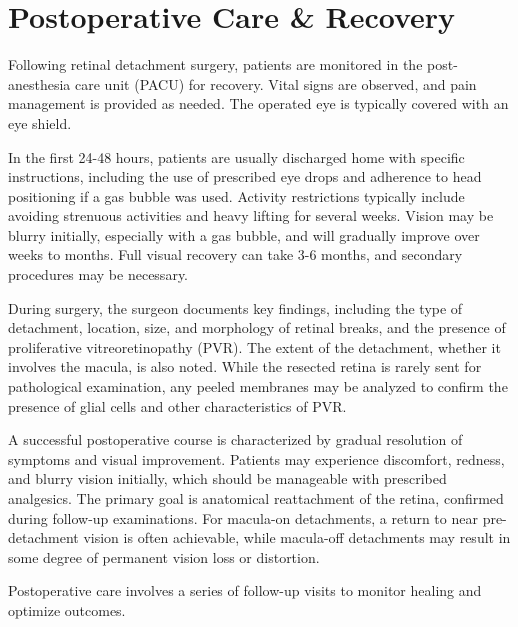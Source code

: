 \section*{Postoperative Care \& Recovery}
Following retinal detachment surgery, patients are monitored in the post-anesthesia care unit (PACU) for recovery. Vital signs are observed, and pain management is provided as needed. The operated eye is typically covered with an eye shield.

In the first 24-48 hours, patients are usually discharged home with specific instructions, including the use of prescribed eye drops and adherence to head positioning if a gas bubble was used. Activity restrictions typically include avoiding strenuous activities and heavy lifting for several weeks. Vision may be blurry initially, especially with a gas bubble, and will gradually improve over weeks to months. Full visual recovery can take 3-6 months, and secondary procedures may be necessary.

During surgery, the surgeon documents key findings, including the type of detachment, location, size, and morphology of retinal breaks, and the presence of proliferative vitreoretinopathy (PVR). The extent of the detachment, whether it involves the macula, is also noted. While the resected retina is rarely sent for pathological examination, any peeled membranes may be analyzed to confirm the presence of glial cells and other characteristics of PVR.

A successful postoperative course is characterized by gradual resolution of symptoms and visual improvement. Patients may experience discomfort, redness, and blurry vision initially, which should be manageable with prescribed analgesics. The primary goal is anatomical reattachment of the retina, confirmed during follow-up examinations. For macula-on detachments, a return to near pre-detachment vision is often achievable, while macula-off detachments may result in some degree of permanent vision loss or distortion.

Postoperative care involves a series of follow-up visits to monitor healing and optimize outcomes.

